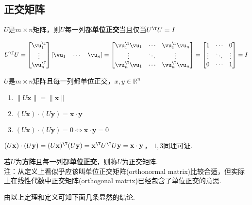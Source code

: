 \subsection{正交矩阵}
\begin{theorem}
$U$是$m\times n$矩阵，则$U$每一列都\textbf{单位正交}当且仅当$U^\T U=I$
\end{theorem}
\begin{analysis}
\[U^\T U=\begin{bmatrix}\vu_1^\T \\\vdots\\\vu_n^\T \end{bmatrix}[\vu_1\quad\cdots\quad\vu_n]
=\begin{bmatrix}\vu_1^\T \vu_1 & \cdots & \vu_1^\T \vu_n\\
\vdots&\ddots&\vdots\\
\vu_n^\T \vu_1 & \cdots & \vu_n^\T \vu_n\\\end{bmatrix}
=\begin{bmatrix}1 & \cdots & 0\\
\vdots&\ddots&\vdots\\
0 & \cdots & 1\\\end{bmatrix}=I\]
\end{analysis}
\begin{theorem}
$U$是$m\times n$矩阵且每一列都单位正交，$x,y\in\mathbb{R}^n$
\begin{enumerate}
	\itemsep -3pt
	\item $\|U\mathbf{x}\|=\|\mathbf{x}\|$
	\item $(U\mathbf{x})\cdot(U\mathbf{y})=\mathbf{x}\cdot\mathbf{y}$
	\item $(U\mathbf{x})\cdot(U\mathbf{y})=0\iff\mathbf{x}\cdot\mathbf{y}=0$
\end{enumerate}
\end{theorem}
\begin{analysis}
$(U\mathbf{x})\cdot(U\mathbf{y})=(U\mathbf{x})^\T (U\mathbf{y})=\mathbf{x}^\T U^\T U\mathbf{y}=\mathbf{x}\cdot\mathbf{y}$，
$1,3$同理可证.
\end{analysis}
\begin{definition}[正交矩阵]
若$U$为\textbf{方阵}且每一列都\textbf{单位正交}，则称$U$为正交矩阵.\\
注：从定义上看似乎应该叫单位正交矩阵(orthonormal matrix)比较合适，但实际上在线性代数中正交矩阵(orthogonal matrix)已经包含了单位正交的意思.
\end{definition}
由以上定理和定义可知下面几条显然的结论.
